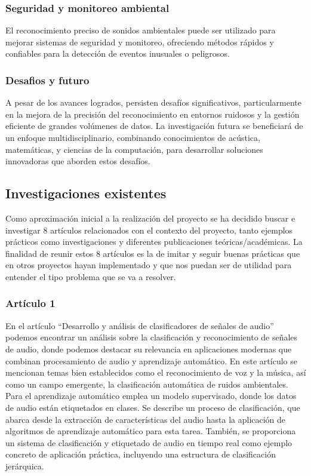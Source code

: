 \subsubsection*{Seguridad y monitoreo ambiental}
El reconocimiento preciso de sonidos ambientales puede ser utilizado para mejorar sistemas de seguridad y monitoreo, ofreciendo métodos rápidos y confiables para la detección de eventos inusuales o peligrosos.
\subsubsection*{Desafios y futuro}
A pesar de los avances logrados, persisten desafíos significativos, particularmente en la mejora de la precisión del reconocimiento en entornos ruidosos y la gestión eficiente de grandes volúmenes de datos. La investigación futura se beneficiará de un enfoque multidisciplinario, combinando conocimientos de acústica, matemáticas, y ciencias de la computación, para desarrollar soluciones innovadoras que aborden estos desafíos.
\subsection{Investigaciones existentes}
Como aproximación inicial a la realización del proyecto se ha decidido buscar e investigar 8 artículos relacionados con el contexto del proyecto, tanto ejemplos prácticos como investigaciones y diferentes publicaciones teóricas/académicas. La finalidad de reunir estos 8 artículos es la de imitar y seguir buenas prácticas que en otros proyectos hayan implementado y que nos puedan ser de utilidad para entender el tipo problema que se va a resolver.
\subsubsection*{Artículo 1}
    En el artículo “Desarrollo y análisis de clasificadores de señales de audio”\cite{aguirre2017desarrollo} podemos encontrar un análisis sobre la clasificación y reconocimiento de señales de audio, donde podemos destacar su relevancia en aplicaciones modernas que combinan procesamiento de audio y aprendizaje automático. En este artículo se mencionan temas bien establecidos como el reconocimiento de voz y la música, así como un campo emergente, la clasificación automática de ruidos ambientales. Para el aprendizaje automático emplea un modelo supervisado, donde los datos de audio están etiquetados en clases. Se describe un proceso de clasificación, que abarca desde la extracción de características del audio hasta la aplicación de algoritmos de aprendizaje automático para esta tarea. También, se proporciona un sistema de clasificación y etiquetado de audio en tiempo real como ejemplo concreto de aplicación práctica, incluyendo una estructura de clasificación jerárquica.

